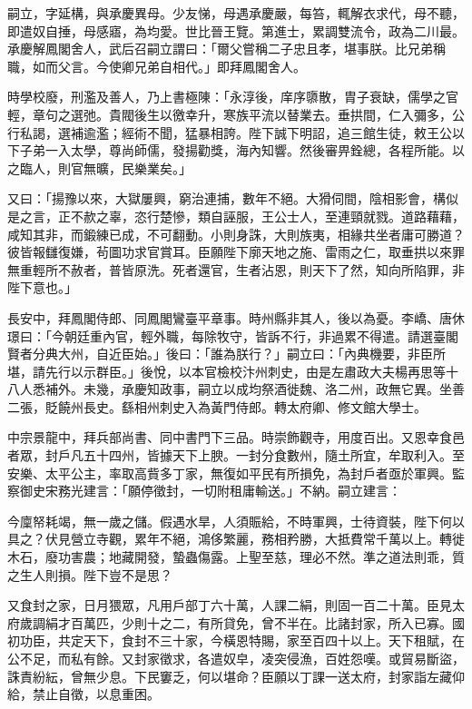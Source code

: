 \begin{pinyinscope}
 嗣立，字延構，與承慶異母。少友悌，母遇承慶嚴，每笞，輒解衣求代，母不聽，即遣奴自捶，母感寤，為均愛。世比晉王覽。第進士，累調雙流令，政為二川最。承慶解鳳閣舍人，武后召嗣立謂曰：「爾父嘗稱二子忠且孝，堪事朕。比兄弟稱職，如而父言。今使卿兄弟自相代。」即拜鳳閣舍人。



 時學校廢，刑濫及善人，乃上書極陳：「永淳後，庠序隳散，胄子衰缺，儒學之官輕，章句之選弛。貴閥後生以徼幸升，寒族平流以替業去。垂拱間，仁入彌多，公行私謁，選補逾濫；經術不聞，猛暴相誇。陛下誠下明詔，追三館生徒，敕王公以下子弟一入太學，尊尚師儒，發揚勸獎，海內知響。然後審畀銓總，各程所能。以之臨人，則官無曠，民樂業矣。」



 又曰：「揚豫以來，大獄屢興，窮治連捕，數年不絕。大猾伺間，陰相影會，構似是之言，正不赥之辜，恣行楚慘，類自誣服，王公士人，至連頸就戮。道路藉藉，咸知其非，而鍛練已成，不可翻動。小則身誅，大則族夷，相緣共坐者庸可勝道？彼皆報讎復嫌，茍圖功求官賞耳。臣願陛下廓天地之施、雷雨之仁，取垂拱以來罪無重輕所不赦者，普皆原洗。死者還官，生者沾恩，則天下了然，知向所陷罪，非陛下意也。」



 長安中，拜鳳閣侍郎、同鳳閣鸞臺平章事。時州縣非其人，後以為憂。李嶠、唐休璟曰：「今朝廷重內官，輕外職，每除牧守，皆訴不行，非過累不得遣。請選臺閣賢者分典大州，自近臣始。」後曰：「誰為朕行？」嗣立曰：「內典機要，非臣所堪，請先行以示群臣。」後悅，以本官檢校汴州刺史，由是左肅政大夫楊再思等十八人悉補外。未幾，承慶知政事，嗣立以成均祭酒徙魏、洛二州，政無它異。坐善二張，貶饒州長史。繇相州刺史入為黃門侍郎。轉太府卿、修文館大學士。



 中宗景龍中，拜兵部尚書、同中書門下三品。時崇飾觀寺，用度百出。又恩幸食邑者眾，封戶凡五十四州，皆據天下上腴。一封分食數州，隨土所宜，牟取利入。至安樂、太平公主，率取高貲多丁家，無復如平民有所損免，為封戶者亟於軍興。監察御史宋務光建言：「願停徵封，一切附租庸輸送。」不納。嗣立建言：



 今廩帑耗竭，無一歲之儲。假遇水旱，人須賑給，不時軍興，士待資裝，陛下何以具之？伏見營立寺觀，累年不絕，鴻侈繁麗，務相矜勝，大抵費常千萬以上。轉徙木石，廢功害農；地藏開發，蟄蟲傷露。上聖至慈，理必不然。準之道法則乖，質之生人則損。陛下豈不是思？



 又食封之家，日月猥眾，凡用戶部丁六十萬，人課二絹，則固一百二十萬。臣見太府歲調絹才百萬匹，少則十之二，有所貸免，曾不半在。比諸封家，所入已寡。國初功臣，共定天下，食封不三十家，今橫恩特賜，家至百四十以上。天下租賦，在公不足，而私有餘。又封家徵求，各遣奴皁，凌突侵漁，百姓怨嘆。或貿易斷盜，誅責紛紜，曾無少息。下民窶乏，何以堪命？臣願以丁課一送太府，封家詣左藏仰給，禁止自徵，以息重困。




\end{pinyinscope}
